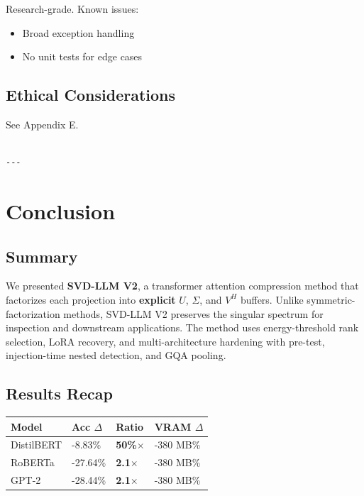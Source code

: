 Research-grade. Known issues:
\begin{itemize}
\item Broad exception handling
\item No unit tests for edge cases

\end{itemize}
\subsection{Ethical Considerations}

See Appendix E.
\begin{lstlisting}

---
\end{lstlisting}


\section{Conclusion}

\subsection{Summary}

We presented \textbf{SVD-LLM V2}, a transformer attention compression method that 
factorizes each projection into \textbf{explicit} $U$, $\Sigma$, and $V^H$ 
buffers. Unlike symmetric-factorization methods, SVD-LLM V2 preserves the 
singular spectrum for inspection and downstream applications. The method 
uses energy-threshold rank selection, LoRA recovery, and multi-architecture 
hardening with pre-test, injection-time nested detection, and GQA pooling.

\subsection{Results Recap}

\begin{table}[H]
\centering
\small
\begin{tabular}{llll}
\toprule
\textbf{Model} & \textbf{Acc $\Delta$} & \textbf{Ratio} & \textbf{VRAM $\Delta$} \\
\midrule
DistilBERT & -8.83\% & \textbf{50\%$\times$} & -380 MB\% \\
RoBERTa & -27.64\% & \textbf{2.1$\times$} & -380 MB\% \\
GPT-2 & -28.44\% & \textbf{2.1$\times$} & -380 MB\% \\
\bottomrule
\end{tabular}
\end{table}

